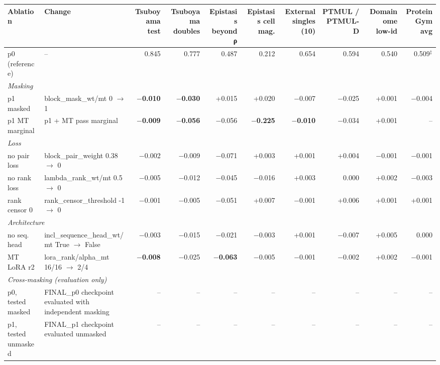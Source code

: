 \begin{tabular}{llrrrrrrrr}
\toprule
Ablation & Change & Tsuboyama test & Tsuboyama doubles & Epistasis beyond ρ & Epistasis cell mag. & External singles (10) & PTMUL / PTMUL-D & Domainome low-id & ProteinGym avg \\
\midrule
p0 (reference) & -- & 0.845 & 0.777 & 0.487 & 0.212 & 0.654 & 0.594 & 0.540 & 0.509$^\ddagger$ \\
\midrule
\multicolumn{10}{l}{\textit{Masking}} \\
p1 masked & block\_mask\_wt/mt 0 $\to$ 1 & \textbf{$-$0.010} & \textbf{$-$0.030} & +0.015 & +0.020 & $-$0.007 & $-$0.025 & +0.001 & $-$0.004 \\
p1 MT marginal & p1 + MT pass marginal & \textbf{$-$0.009} & \textbf{$-$0.056} & $-$0.056 & \textbf{$-$0.225} & \textbf{$-$0.010} & $-$0.034 & +0.001 & -- \\
\midrule
\multicolumn{10}{l}{\textit{Loss}} \\
no pair loss & block\_pair\_weight 0.38 $\to$ 0 & $-$0.002 & $-$0.009 & $-$0.071 & +0.003 & +0.001 & +0.004 & $-$0.001 & $-$0.001 \\
no rank loss & lambda\_rank\_wt/mt 0.5 $\to$ 0 & $-$0.005 & $-$0.012 & $-$0.045 & $-$0.016 & +0.003 & 0.000 & +0.002 & $-$0.003 \\
rank censor 0 & rank\_censor\_threshold -1 $\to$ 0 & $-$0.001 & $-$0.005 & $-$0.051 & +0.007 & $-$0.001 & +0.006 & +0.001 & +0.001 \\
\midrule
\multicolumn{10}{l}{\textit{Architecture}} \\
no seq. head & incl\_sequence\_head\_wt/mt True $\to$ False & $-$0.003 & $-$0.015 & $-$0.021 & $-$0.003 & +0.001 & $-$0.007 & +0.005 & 0.000 \\
MT LoRA r2 & lora\_rank/alpha\_mt 16/16 $\to$ 2/4 & \textbf{$-$0.008} & $-$0.025 & \textbf{$-$0.063} & $-$0.005 & $-$0.001 & $-$0.002 & +0.002 & $-$0.001 \\
\midrule
\multicolumn{10}{l}{\textit{Cross-masking (evaluation only)}} \\
p0, tested masked & FINAL\_p0 checkpoint evaluated with independent masking & -- & -- & -- & -- & -- & -- & -- & -- \\
p1, tested unmasked & FINAL\_p1 checkpoint evaluated unmasked & -- & -- & -- & -- & -- & -- & -- & -- \\
\bottomrule
\end{tabular}
